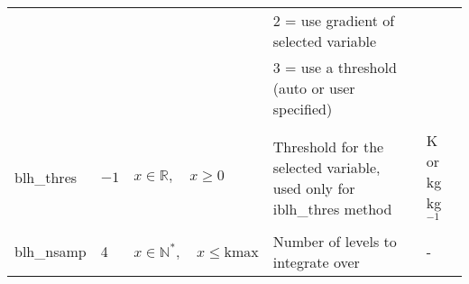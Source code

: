 \documentclass[twoside,11pt,fleqn,a4paper,english,openright]{report}
\begin{document}
\begin{center}
\begin{supertabular}{|l|p{2cm}|p{4cm}|p{6cm}|l|}
  & & & 2 = use gradient of selected variable		&\\
  & & & 3 = use a threshold (auto or user specified)	&\\
  & & & &\\
  blh\_thres	& $-1$	& $x \in \mathbb{R}, \quad x \ge 0$	& Threshold for the selected variable, used only for iblh\_thres method	& K or kg kg$^{-1}$\\
  blh\_nsamp	& 4		& $x \in \mathbb{N}^*, \quad x \le \text{kmax}$	& Number of levels to integrate over	& -\\
\end{supertabular}
\end{center}



\end{document}
